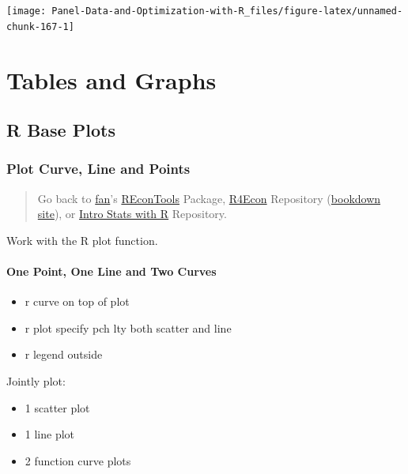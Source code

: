 \documentclass[
]{book}
\providecommand{\tightlist}{%
  \setlength{\itemsep}{0pt}\setlength{\parskip}{0pt}}
\begin{document}
\begin{center}\texttt{[image: Panel-Data-and-Optimization-with-R\_files/figure-latex/unnamed-chunk-167-1]} \end{center}

\hypertarget{tables-and-graphs}{%
\chapter{Tables and Graphs}\label{tables-and-graphs}}

\hypertarget{r-base-plots}{%
\section{R Base Plots}\label{r-base-plots}}

\hypertarget{plot-curve-line-and-points}{%
\subsection{Plot Curve, Line and Points}\label{plot-curve-line-and-points}}

\begin{quote}
Go back to \href{http://fanwangecon.github.io/}{fan}'s \href{https://fanwangecon.github.io/REconTools/}{REconTools} Package, \href{https://fanwangecon.github.io/R4Econ/}{R4Econ} Repository (\href{https://fanwangecon.github.io/R4Econ/bookdown}{bookdown site}), or \href{https://fanwangecon.github.io/Stat4Econ/}{Intro Stats with R} Repository.
\end{quote}

Work with the R plot function.

\hypertarget{one-point-one-line-and-two-curves}{%
\subsubsection{One Point, One Line and Two Curves}\label{one-point-one-line-and-two-curves}}

\begin{itemize}
\tightlist
\item
  r curve on top of plot
\item
  r plot specify pch lty both scatter and line
\item
  r legend outside
\end{itemize}

Jointly plot:

\begin{itemize}
\tightlist
\item
  1 scatter plot
\item
  1 line plot
\item
  2 function curve plots
\end{itemize}
\end{document}
